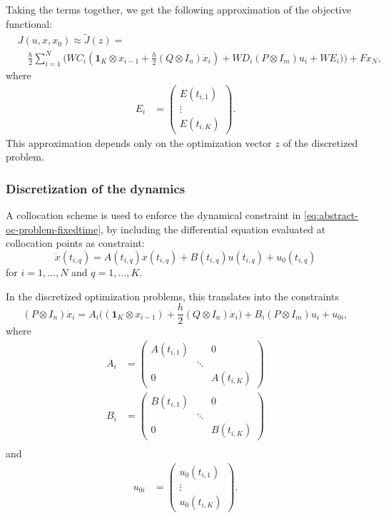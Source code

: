 \documentclass[a4paper,11pt,DIV12]{scrartcl}
\theoremstyle{remark}
\renewcommand{\matrix}[1]{\begin{pmatrix}#1\end{pmatrix}}
\begin{document}
Taking the terms together, we get the following approximation of the objective functional:
\begin{equation}
  \label{eq:objective-gaussian-quadrature-discretized}
  \begin{aligned}
    & J(u,x,x_0) \approx \tilde J(z) = \\
    & \quad \frac{h}{2} \sum_{i=1}^{N} \bigl(W C_i (\textbf{1}_K \otimes x_{i-1} + \frac{h}{2} (Q \otimes I_n) \dot x_i) + W D_i (P \otimes I_m) u_i + W E_i) \bigr) + F x_N,
  \end{aligned}
\end{equation}
where
\begin{equation}
  \begin{aligned}
    E_i &= \matrix{E(t_{i,1}) \\ \vdots \\ E(t_{i,K})}.
  \end{aligned}
\end{equation}
This approximation depends only on the optimization vector $z$ of the discretized problem.

\subsubsection{Discretization of the dynamics}
\label{sec:discr-dynam}

A collocation scheme is used to enforce the dynamical constraint in \eqref{eq:abstract-oc-problem-fixedtime}, by including the differential equation evaluated at collocation points as constraint:
\begin{equation}
  \label{eq:collocation}
  \dot x(t_{i,q}) = A(t_{i,q}) x(t_{i,q}) + B(t_{i,q}) u(t_{i,q}) + u_0(t_{i,q})
\end{equation}
for $i=1,\dotsc,N$ and $q=1,\dotsc,K$.

In the discretized optimization problems, this translates into the constraints
\begin{equation}
  \label{eq:collocation-discretized}
  (P \otimes I_n) \dot x_i = A_i \bigl( (\mathbf{1}_K \otimes x_{i-1}) + \frac{h}{2} (Q \otimes I_n) \dot x_i \bigr)
  + B_i (P \otimes I_m) u_i + u_{0i},
\end{equation}
where
\begin{equation}
  \begin{aligned}
    A_i &= \matrix{A(t_{i,1}) & & 0 \\ & \ddots & \\ 0 & & A(t_{i,K})} \\
    B_i &= \matrix{B(t_{i,1}) & & 0 \\ & \ddots & \\ 0 & & B(t_{i,K})} \\
  \end{aligned}
\end{equation}
 and
\begin{equation}
  \begin{aligned}
    u_{0i} &= \matrix{u_0(t_{i,1}) \\ \vdots \\ u_0(t_{i,K})}.
  \end{aligned}
\end{equation}
\end{document}
